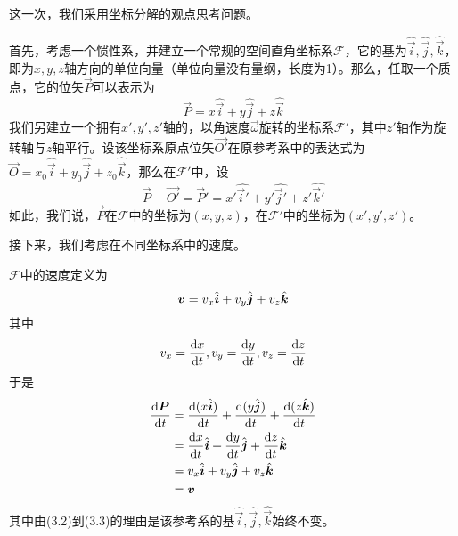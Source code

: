 \begin{prove}
	这一次，我们采用坐标分解的观点思考问题。
	
	首先，考虑一个惯性系，并建立一个常规的空间直角坐标系$\mathcal{F}$，它的基为$\hat{\vec{i}},\hat{\vec{j}},\hat{\vec{k}}$，即为$x,y,z$轴方向的单位向量（单位向量没有量纲，长度为1）。那么，任取一个质点，它的位矢$\vec{P}$可以表示为\[
	\vec{P}=x\hat{\vec{i}}+y\hat{\vec{j}}+z\hat{\vec{k}}
	\]
	我们另建立一个拥有$x',y',z'$轴的，以角速度$\vec{\omega}$旋转的坐标系$\mathcal{F}'$，其中$z'$轴作为旋转轴与$z$轴平行。设该坐标系原点位矢$\vec{O'}$在原参考系中的表达式为$\vec{O}=x_0\hat{\vec{i}}+y_0\hat{\vec{j}}+z_0\hat{\vec{k}}$，那么在$\mathcal{F}'$中，设
	\[\vec{P}-\vec{O'}=\vec{P}'=x'\hat{\vec{i}'}+y'\hat{\vec{j}'}+z'\hat{\vec{k}'}\]
	如此，我们说，$\vec{P}$在$\mathcal{F}$中的坐标为$(x,y,z)$，在$\mathcal{F}'$中的坐标为$(x',y',z')$。
	
	接下来，我们考虑在不同坐标系中的速度。
	
	$\mathcal{F}$中的速度定义为\[\boldsymbol{v}=v_x\hat{\boldsymbol{i}}+v_y\hat{\boldsymbol{j}}+v_z\hat{\boldsymbol{k}}\]其中
	\[v_x=\dfrac{\dif x}{\dif t},v_y=\dfrac{\dif y}{\dif t},v_z=\dfrac{\dif z}{\dif t}\]
	于是
	\begin{align}
		\dfrac{\dif\vec{P}}{\dif t}&=\dfrac{\dif(x\hat{\vec{i}})}{\dif t}+\dfrac{\dif(y\hat{\vec{j}})}{\dif t}+\dfrac{\dif(z\hat{\vec{k}})}{\dif t}\\
		&=\dfrac{\dif x}{\dif t}\hat{\vec{i}}+\dfrac{\dif y}{\dif t}\hat{\vec{j}}+\dfrac{\dif z}{\dif t}\hat{\vec{k}}\\
		&=v_x\hat{\vec{i}}+v_y\hat{\vec{j}}+v_z\hat{\vec{k}}\\
		&=\vec{v}
	\end{align}
	其中由(3.2)到(3.3)的理由是该参考系的基$\hat{\vec{i}},\hat{\vec{j}},\hat{\vec{k}}$始终不变。
	

\end{prove}
